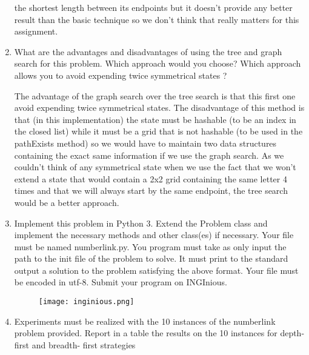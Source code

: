 \begin{enumerate}
\begin{framed}
            the shortest length between its endpoints but it doesn't provide any better result than the
            basic technique so we don't think that really matters for this
            assignment.
        \end{framed}
    \item What are the advantages and disadvantages of using the tree
        and graph search for this problem. Which approach would you
        choose? Which approach allows you to avoid expending twice
        symmetrical states ?
        \begin{framed}
            The advantage of the graph search over the tree search is that
            this first one avoid expending twice symmetrical states. The
            disadvantage of this method is that (in this implementation)
            the state must be hashable (to be an index in the closed list)
            while it must be a grid that is not hashable (to be used in the pathExists
            method) so we would have to maintain two data structures
            containing the exact same information if we use the graph
            search. As we couldn't think of any symmetrical state when we
            use the fact that we won't extend a state that would contain a
            2x2 grid containing the same letter 4 times and that we will
            always start by the same endpoint, the tree search would be a
            better approach.
        \end{framed}
    \item Implement this problem in Python 3. Extend the Problem class
        and implement the necessary methods and other class(es) if
        necessary. Your file must be named numberlink.py. You program
        must take as only input the path to the init file of the problem
        to solve. It must print to the standard output a solution to the
        problem satisfying the above format. Your file must be encoded
        in utf-8. Submit your program on INGInious.
        \begin{figure}[!ht]
            \begin{framed}
                \centering
                \texttt{[image: inginious.png]}
            \end{framed}
        \end{figure}
        \FloatBarrier
    \item Experiments must be realized with the 10 instances of the
        numberlink problem provided. Report in a table the results on
        the 10 instances for depth-first and breadth- first strategies

\end{enumerate}
